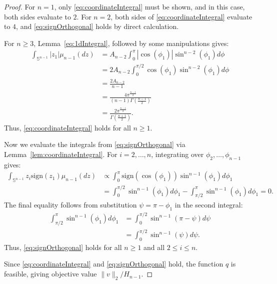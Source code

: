 \documentclass[twoside]{article}
\theoremstyle{definition}
\renewcommand{\S}{\mathbb{S}}
\newcommand{\sign}{\mathrm{sign}}
\newcommand{\1}[1]{\scalebox{1.25}{$\mathds{1}$}\left[#1\right]}
\begin{document}
\begin{proof}
For $n=1$, only \eqref{eq:coordinateIntegral}  must be shown, and in this case, both sides evaluate to $2$. For $n=2$, both sides of \eqref{eq:coordinateIntegral} evaluate to $4$, and \eqref{eq:signOrthogonal} holds by direct calculation. 

For $n\ge 3$, Lemma~\ref{eq:1dIntegral}, followed by  some manipulations gives:
\begin{align*}
\int_{\S^{n-1}}|z_1|\mu_{n-1}(dz)&=A_{n-2}\int_0^\pi |\cos(\phi_1)|\sin^{n-2}(\phi_1)d\phi \\
&=2A_{n-2}\int_0^{\pi/2} \cos(\phi_1)\sin^{n-2}(\phi_1)d\phi \\
&=\frac{2A_{n-2}}{n-1} \\
&=\frac{4\pi^{\frac{n-1}{2}}}{(n-1)\Gamma\left(\frac{n-1}{2}\right)}\\
&=\frac{2\pi^{\frac{n-1}{2}}}{\Gamma\left(\frac{n+1}{2}\right)}.
\end{align*}
Thus, \eqref{eq:coordinateIntegral} holds for all $n\ge 1$.

Now we evaluate the integrals from \eqref{eq:signOrthogonal} via Lemma~\ref{lem:coordinateIntegral}. %
%
For $i=2,\ldots,n$, integrating over $\phi_2, \ldots, \phi_{n-1}$ gives:
\begin{align*}
\int_{\S^{n-1}}z_i\sign(z_1)\mu_{n-1}(dz)
&\propto \int_{0}^\pi \sign(\cos(\phi_1))\sin^{n-1}(\phi_1)d\phi_1 \\
&=\int_0^{\pi/2}\sin^{n-1}(\phi_1)d\phi_1 - \int_{\pi/2}^{\pi}\sin^{n-1}(\phi_1)d\phi_1 = 0.
\end{align*}
The final equality follows from substitution $\psi=\pi-\phi_1$ in the second integral:
\begin{align*}
\int_{\pi/2}^{\pi}\sin^{n-1}(\phi_1)d\phi_1 &=\int_0^{\pi/2}\sin^{n-1}(\pi-\psi)d\psi \\
&=\int_0^{\pi/2}\sin^{n-1}(\psi)d\psi. 
\end{align*}
Thus, \eqref{eq:signOrthogonal} holds for all $n\ge 1$ and all $2\le i \le n$.

Since \eqref{eq:coordinateIntegral} and \eqref{eq:signOrthogonal} hold, the function $q$ is feasible, giving objective value $\|v\|_2/H_{n-1}.$


\end{proof}
\end{document}
